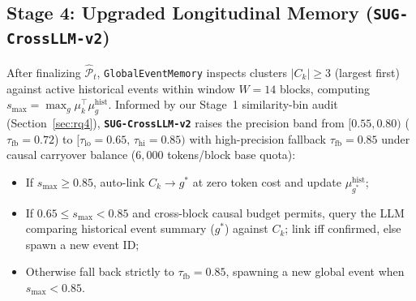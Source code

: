 \subsection{Stage 4: Upgraded Longitudinal Memory (\texttt{SUG-CrossLLM-v2})}
After finalizing $\widehat{\mathcal{P}}_t$, \texttt{GlobalEventMemory} inspects clusters $|C_k| \ge 3$ (largest first) against active historical events within window $W=14$ blocks, computing $s_{\max} = \max_{g} \mu_k^\top \mu_g^{\text{hist}}$. Informed by our Stage~1 similarity-bin audit (Section~\ref{sec:rq4}), \textbf{\texttt{SUG-CrossLLM-v2}} raises the precision band from $[0.55, 0.80)$ ($\tau_{\text{fb}}=0.72$) to $[\tau_{\text{lo}}=0.65,\, \tau_{\text{hi}}=0.85)$ with high-precision fallback $\tau_{\text{fb}} = 0.85$ under causal carryover balance ($6{,}000$ tokens/block base quota):
\begin{itemize}
    \item If $s_{\max} \ge 0.85$, auto-link $C_k \to g^*$ at zero token cost and update $\mu_{g^*}^{\text{hist}}$;
    \item If $0.65 \le s_{\max} < 0.85$ and cross-block causal budget permits, query the LLM comparing historical event summary ($g^*$) against $C_k$; link iff confirmed, else spawn a new event ID;
    \item Otherwise fall back strictly to $\tau_{\text{fb}} = 0.85$, spawning a new global event when $s_{\max} < 0.85$.
\end{itemize}

